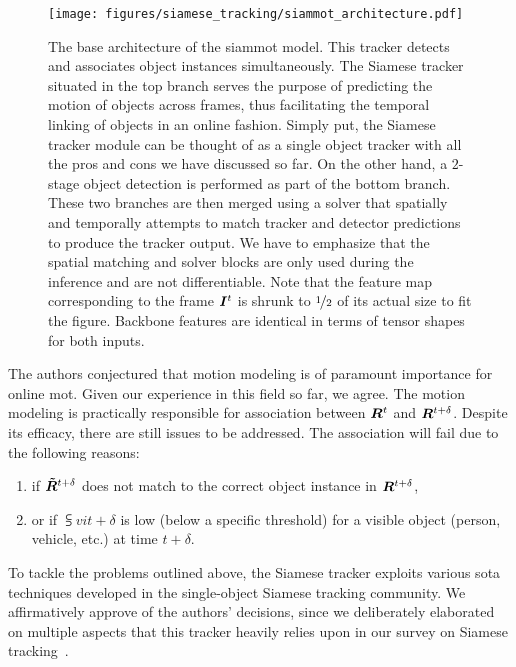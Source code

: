 \begin{figure}[t]
    \centering
    \texttt{[image: figures/siamese\_tracking/siammot\_architecture.pdf]}
    \caption[\gls{siammot} architecture]{The base architecture of the \gls{siammot} model. This tracker detects and associates object instances simultaneously. The Siamese tracker situated in the top branch serves the purpose of predicting the motion of objects across frames, thus facilitating the temporal linking of objects in an online fashion. Simply put, the Siamese tracker module can be thought of as a single object tracker with all the pros and cons we have discussed so far. On the other hand, a $2$-stage object detection is performed as part of the bottom branch. These two branches are then merged using a solver that spatially and temporally attempts to match tracker and detector predictions to produce the tracker output. We have to emphasize that the spatial matching and solver blocks are only used during the inference and are not differentiable. Note that the feature map corresponding to the frame $\bm{I}^{t}$ is shrunk to $\nicefrac{1}{2}$ of its actual size to fit the figure. Backbone features are identical in terms of tensor shapes for both inputs. }
    \label{fig:SiamMOTArchitecture}
\end{figure}

The authors conjectured that motion modeling is of paramount importance for online \gls{mot}. Given our experience in this field so far, we agree. The motion modeling is practically responsible for association between $\bm{R}^{t}$ and $\bm{R}^{t + \delta}$. Despite its efficacy, there are still issues to be addressed. The association will fail due to the following reasons:
\begin{enumerate}
    \item if $\bm{\tilde{R}}^{t + \delta}$ does not match to the correct object instance in $\bm{R}^{t + \delta}$,
    \item or if $\subsup{v}{i}{t + \delta}$ is low (below a specific threshold) for a visible object (person, vehicle, etc.) at time $t + \delta$.
\end{enumerate}
To tackle the problems outlined above, the Siamese tracker exploits various \gls{sota} techniques developed in the single-object Siamese tracking community. We affirmatively approve of the authors' decisions, since we deliberately elaborated on multiple aspects that this tracker heavily relies upon in our survey on Siamese tracking~\cite{ondrasovic2021siamese}.

